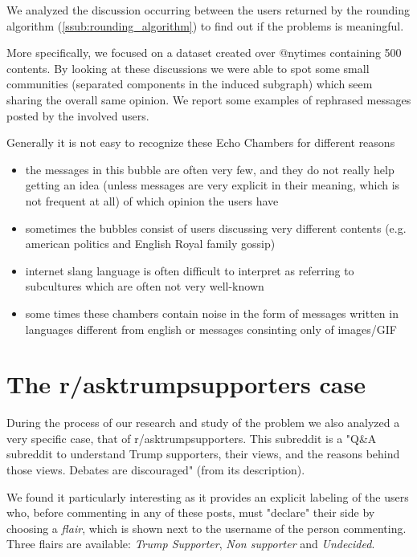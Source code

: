 We analyzed the discussion occurring between the users returned by the
rounding algorithm (\autoref{ssub:rounding_algorithm}) to find out if the
problems is meaningful.

More specifically, we focused on a dataset created over @nytimes containing 500
contents. By looking at these discussions we were able to spot some small
communities (separated components in the induced subgraph) which seem sharing
the overall same opinion. We report some examples of rephrased messages posted
by the involved users.


Generally it is not easy to recognize these Echo Chambers for different reasons

\begin{itemize}
	\item the messages in this bubble are often very few, and they do not
	      really help getting an idea (unless messages are very explicit in their
	      meaning, which is not frequent at all) of which opinion the users have
	\item sometimes the bubbles consist of users discussing very
	      different contents (e.g. american politics and English Royal
	      family gossip)
	\item internet slang language is often difficult to interpret as
	      referring to subcultures which are often not very well-known
	\item some times these chambers contain noise in the form of messages
	      written in languages different from english or messages consinting only
	      of images/GIF
\end{itemize}

\section{The r/asktrumpsupporters case}%
\label{sec:the_r_asktrumpsupporters_case}

During the process of our research and study of the problem we also analyzed a
very specific case, that of r/asktrumpsupporters. This subreddit is a "Q\&A
subreddit to understand Trump supporters, their views, and the reasons behind
those views. Debates are discouraged" (from its description).

We found it particularly interesting as it provides an explicit labeling of the
users who, before commenting in any of these posts, must "declare" their side
by choosing a \emph{flair}, which is shown next to the username of the person
commenting.  Three flairs are available: \emph{Trump Supporter}, \emph{Non
	supporter} and \emph{Undecided}.

